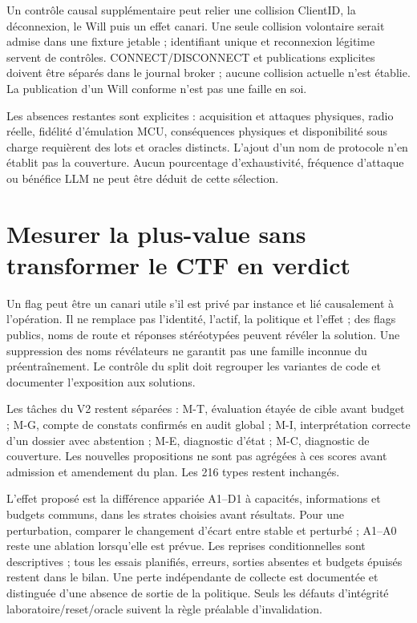\documentclass[11pt,a4paper]{article}
\begin{document}
Un contrôle causal supplémentaire peut relier une collision ClientID, la déconnexion, le Will puis un effet canari. Une seule collision volontaire serait admise dans une fixture jetable ; identifiant unique et reconnexion légitime servent de contrôles. CONNECT/DISCONNECT et publications explicites doivent être séparés dans le journal broker ; aucune collision actuelle n'est établie. La publication d'un Will conforme n'est pas une faille en soi.

Les absences restantes sont explicites : acquisition et attaques physiques, radio réelle, fidélité d'émulation MCU, conséquences physiques et disponibilité sous charge requièrent des lots et oracles distincts. L'ajout d'un nom de protocole n'en établit pas la couverture. Aucun pourcentage d'exhaustivité, fréquence d'attaque ou bénéfice LLM ne peut être déduit de cette sélection.

\section{Mesurer la plus-value sans transformer le CTF en verdict}
Un flag peut être un canari utile s'il est privé par instance et lié causalement à l'opération. Il ne remplace pas l'identité, l'actif, la politique et l'effet ; des flags publics, noms de route et réponses stéréotypées peuvent révéler la solution. Une suppression des noms révélateurs ne garantit pas une famille inconnue du préentraînement. Le contrôle du split doit regrouper les variantes de code et documenter l'exposition aux solutions.

Les tâches du V2 restent séparées : M-T, évaluation étayée de cible avant budget ; M-G, compte de constats confirmés en audit global ; M-I, interprétation correcte d'un dossier avec abstention ; M-E, diagnostic d'état ; M-C, diagnostic de couverture. Les nouvelles propositions ne sont pas agrégées à ces scores avant admission et amendement du plan. Les 216 types restent inchangés.

L'effet proposé est la différence appariée A1--D1 à capacités, informations et budgets communs, dans les strates choisies avant résultats. Pour une perturbation, comparer le changement d'écart entre stable et perturbé ; A1--A0 reste une ablation lorsqu'elle est prévue. Les reprises conditionnelles sont descriptives ; tous les essais planifiés, erreurs, sorties absentes et budgets épuisés restent dans le bilan. Une perte indépendante de collecte est documentée et distinguée d'une absence de sortie de la politique. Seuls les défauts d'intégrité laboratoire/reset/oracle suivent la règle préalable d'invalidation.
\end{document}
